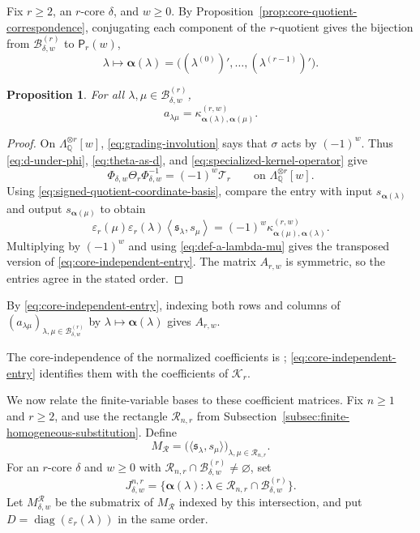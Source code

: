 \documentclass[12pt,reqno,a4paper]{amsart}
\numberwithin{equation}{section}
\numberwithin{figure}{section}
\theoremstyle{plain}
\newtheorem{proposition}[theorem]{Proposition}
\theoremstyle{definition}
\newcommand{\eps}{\varepsilon}
\newcommand{\inner}[2]{\left\langle #1,#2\right\rangle}
\begin{document}
Fix $r\geq2$, an $r$-core $\delta$, and $w\geq0$.
By Proposition~\ref{prop:core-quotient-correspondence}, conjugating
each component of the $r$-quotient gives the bijection from
$\mathcal B_{\delta,w}^{(r)}$ to $\mathsf P_r(w)$,
\[
 \lambda\longmapsto
 \boldsymbol\alpha(\lambda)
 =\bigl((\lambda^{(0)})',\ldots,(\lambda^{(r-1)})'\bigr).
\]

\begin{proposition}
\label{prop:core-independent-matrix}
For all $\lambda,\mu\in\mathcal B_{\delta,w}^{(r)}$,
\begin{equation}\label{eq:core-independent-entry}
 a_{\lambda\mu}
 =\kappa^{(r,w)}_{
    \boldsymbol\alpha(\lambda),\boldsymbol\alpha(\mu)}.
\end{equation}
\end{proposition}

\begin{proof}
On $\Lambda_{\mathbb Q}^{\otimes r}[w]$,
\eqref{eq:grading-involution} says that $\sigma$ acts by $(-1)^w$.
Thus \eqref{eq:d-under-phi}, \eqref{eq:theta-as-d}, and
\eqref{eq:specialized-kernel-operator} give
\[
 \Phi_{\delta,w}\Theta_r\Phi_{\delta,w}^{-1}
 =(-1)^w\mathcal T_r
 \qquad\text{on }\Lambda_{\mathbb Q}^{\otimes r}[w].
\]
Using \eqref{eq:signed-quotient-coordinate-basis}, compare the entry
with input $s_{\boldsymbol\alpha(\lambda)}$ and output
$s_{\boldsymbol\alpha(\mu)}$ to obtain
\[
 \eps_r(\mu)\eps_r(\lambda)
 \inner{\mathfrak{s}_\lambda}{s_\mu}
 =(-1)^w
 \kappa^{(r,w)}_{
  \boldsymbol\alpha(\mu),\boldsymbol\alpha(\lambda)}.
\]
Multiplying by $(-1)^w$ and using \eqref{eq:def-a-lambda-mu} gives
the transposed version of \eqref{eq:core-independent-entry}.
The matrix $A_{r,w}$ is symmetric, so the entries agree in the stated
order.
\end{proof}

By \eqref{eq:core-independent-entry}, indexing both rows and columns
of $(a_{\lambda\mu})_{\lambda,\mu\in\mathcal B_{\delta,w}^{(r)}}$
by $\lambda\mapsto\boldsymbol\alpha(\lambda)$ gives $A_{r,w}$.

The core-independence of the normalized coefficients is
\cite[Corollary~2.10, p.~586]{Walker};
\eqref{eq:core-independent-entry} identifies them with the
coefficients of $\mathcal K_r$.

We now relate the finite-variable bases to these coefficient
matrices.  Fix $n\geq1$ and $r\geq2$, and use
the rectangle $\mathcal R_{n,r}$ from
Subsection~\ref{subsec:finite-homogeneous-substitution}.  Define
\[
 M_{\mathcal R}
 =\bigl(\langle\mathfrak s_\lambda,s_\mu\rangle\bigr)_{
                         \lambda,\mu\in\mathcal R_{n,r}}.
\]
For an $r$-core $\delta$ and $w\geq0$ with
$\mathcal R_{n,r}\cap\mathcal B_{\delta,w}^{(r)}\neq\varnothing$,
set
\[
 J_{\delta,w}^{n,r}
 =\{\boldsymbol\alpha(\lambda):
             \lambda\in\mathcal R_{n,r}\cap\mathcal B_{\delta,w}^{(r)}\}.
\]
Let $M_{\delta,w}^{\mathcal R}$ be the submatrix of $M_{\mathcal R}$
indexed by this intersection, and put
$D=\operatorname{diag}(\eps_r(\lambda))$ in the same order.
\end{document}
